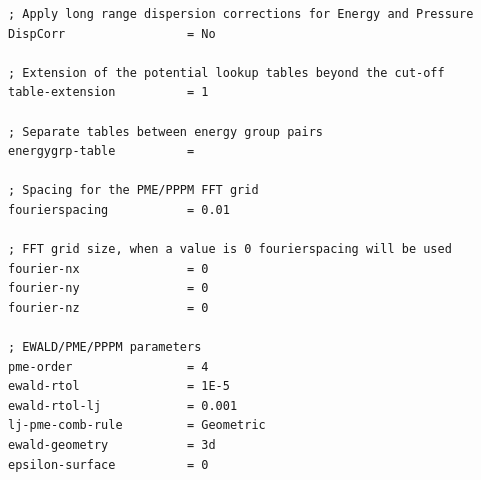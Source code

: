 \documentclass[10pt,twoside,a4paper]{report}
\begin{document}
\begin{appendices}
\begin{verbatim}
; Apply long range dispersion corrections for Energy and Pressure
DispCorr                 = No

; Extension of the potential lookup tables beyond the cut-off
table-extension          = 1

; Separate tables between energy group pairs
energygrp-table          = 

; Spacing for the PME/PPPM FFT grid
fourierspacing           = 0.01

; FFT grid size, when a value is 0 fourierspacing will be used
fourier-nx               = 0
fourier-ny               = 0
fourier-nz               = 0

; EWALD/PME/PPPM parameters
pme-order                = 4
ewald-rtol               = 1E-5
ewald-rtol-lj            = 0.001
lj-pme-comb-rule         = Geometric
ewald-geometry           = 3d
epsilon-surface          = 0

\end{verbatim}















\end{appendices}
\end{document}
